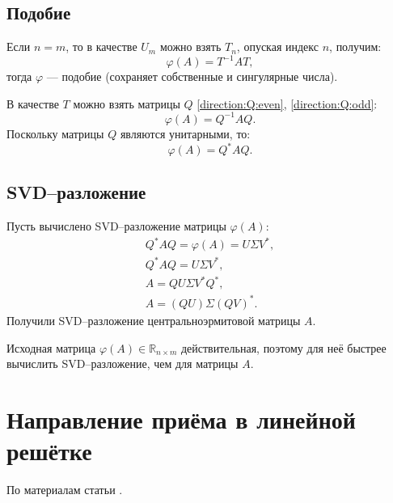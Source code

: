 \subsection{Подобие}

Если $n = m$, то в качестве $U_m$ можно взять $T_n$, опуская индекс $n$, получим:
\[
    \varphi(A) = T^{-1} A T ,
\]
тогда $\varphi$ --- подобие (сохраняет собственные и сингулярные числа).

В качестве $T$ можно взять матрицы $Q$ \eqref{direction:Q:even}, \eqref{direction:Q:odd}:
\[
    \varphi(A) = Q^{-1} A Q .
\]
Поскольку матрицы $Q$ являются унитарными, то:
\[
    \varphi(A) = Q^* A Q .
\]

\subsection{SVD--разложение}

Пусть вычислено SVD--разложение матрицы $\varphi(A)$:
\begin{gather*}
    Q^* A Q = \varphi(A) = U \Sigma V^* , \\
    Q^* A Q = U \Sigma V^* , \\
    A = Q U \Sigma V^* Q^* , \\
    A = \left( Q U \right ) \Sigma \left( Q V \right)^* .
\end{gather*}
Получили SVD--разложение центральноэрмитовой матрицы $A$.

Исходная матрица $\varphi(A) \in \mathbb{R}_{n \times m}$ действительная, поэтому для неё быстрее вычислить SVD--разложение, чем для матрицы $A$.

\section{Направление приёма в линейной решётке}

По материалам статьи \cite{Cao_Liu}.

